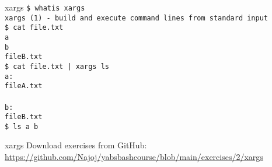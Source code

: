 \documentclass{beamer}
\let\tt\texttt
\begin{document}
\begin{frame}{xargs}
        \tt{\$ whatis xargs}\\
        \tt{xargs (1)  - build and execute command lines from standard input}\\
        \tt{\$ cat file.txt} \\
        \tt{a} \\
        \tt{b} \\
        \tt{fileB.txt} \\
        \tt{\$ cat file.txt | xargs ls} \\
        \tt{a:} \\
        \tt{fileA.txt} \\
        \tt{} \\
        \tt{b:} \\
        \tt{fileB.txt} \\
        \tt{\$ ls a b} \\
\end{frame}

\begin{frame}{xargs}
        Download exercises from GitHub: \\
        \url{https://github.com/Najoj/yabsbashcourse/blob/main/exercises/2/xargs}
\end{frame}
\end{document}
